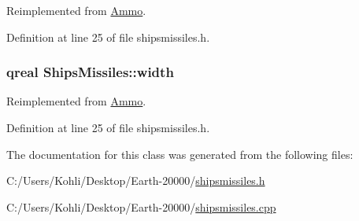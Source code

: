Reimplemented from \hyperlink{class_ammo_a86583f8632ca9604ef0ae839d78fe5ef}{Ammo}.

Definition at line 25 of file shipsmissiles.h.\hypertarget{class_ships_missiles_a335b53cf15200f696ba3c8cdd9b38d85}{
\subsubsection[{width}]{\setlength{\rightskip}{0pt plus 5cm}qreal {\bf ShipsMissiles::width}}}
\label{class_ships_missiles_a335b53cf15200f696ba3c8cdd9b38d85}


Reimplemented from \hyperlink{class_ammo_aad7996f9abdcb6ade7e67f7c7f5e5ebe}{Ammo}.

Definition at line 25 of file shipsmissiles.h.

The documentation for this class was generated from the following files:\begin{DoxyCompactItemize}
\item 
C:/Users/Kohli/Desktop/Earth-\/20000/\hyperlink{shipsmissiles_8h}{shipsmissiles.h}\item 
C:/Users/Kohli/Desktop/Earth-\/20000/\hyperlink{shipsmissiles_8cpp}{shipsmissiles.cpp}\end{DoxyCompactItemize}
